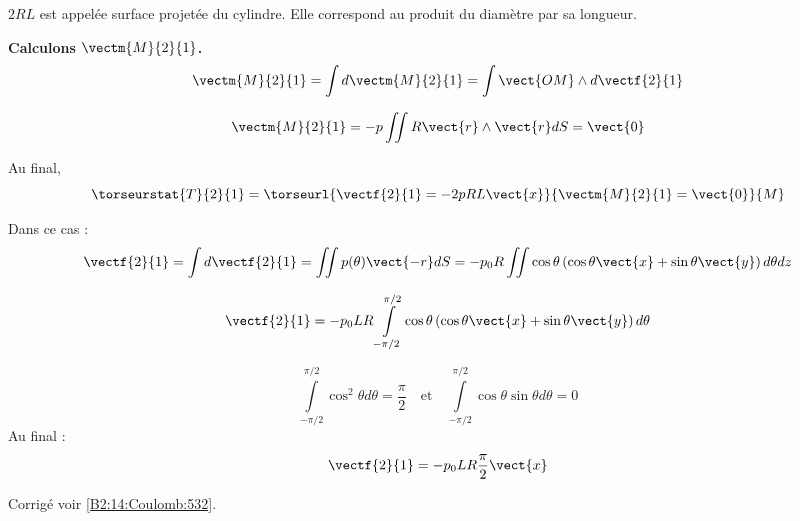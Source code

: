 $2RL$ est appelée surface projetée du cylindre. Elle correspond au produit du diamètre par sa longueur.

\vspace{.5cm}

\textbf{Calculons $\vectm{M}{2}{1}$.}
$$
\vectm{M}{2}{1} = \int d\vectm{M}{2}{1}= \int \vect{OM}\wedge d\vectf{2}{1}
$$

$$
\vectm{M}{2}{1} = -p \iint R\vect{r} \wedge \vect{r}dS = \vect{0}
$$

Au final, 
$$
\torseurstat{T}{2}{1} = \torseurl{\vectf{2}{1} = -2pRL\vect{x}}{\vectm{M}{2}{1} =  \vect{0}}{M}
$$

\else
\fi





\ifprof
Dans ce cas : 
$$
\vectf{2}{1} = \int d\vectf{2}{1} = \iint p(\theta) \vect{-r} dS 
= - p_0R\iint\cos\theta  \left(\cos\theta\vect{x}+\sin\theta\vect{y} \right)  d\theta dz$$

$$
\vectf{2}{1} 
= - p_0 L R\int\limits_{-\pi/2}^{\pi/2}\cos\theta  \left(\cos\theta\vect{x}+\sin\theta\vect{y} \right)  d\theta$$

$$
\int\limits_{-\pi/2}^{\pi/2}\cos^2\theta  d\theta = \dfrac{\pi}{2}
\quad 
\text{et}
\quad
\int\limits_{-\pi/2}^{\pi/2}\cos\theta \sin\theta  d\theta = 0
$$
Au final :
$$
\vectf{2}{1} 
= - p_0 L R \dfrac{\pi}{2}\vect{x}$$
\else
\fi



\ifprof
\else
\begin{flushright}
\footnotesize{Corrigé  voir \ref{B2:14:Coulomb:532}.}
\end{flushright}%
\fi